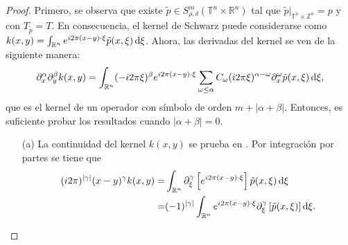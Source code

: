 \begin{proof}
	Primero, se observa que existe $\tilde{p} \in S^m_{\rho, \delta}(\mathbb{T}^n \times \mathbb{R}^n)$ tal que $\tilde{p}|_{\mathbb{T}^n \times \mathbb{Z}^n} = p$ y con $T_{\tilde{p}} = T$. En consecuencia, el kernel de Schwarz puede considerarse como $k(x, y) = \int_{\mathbb{R}^n} e^{i2\pi(x-y)\cdot \xi} \tilde{p}(x, \xi)\mathop{}\!\mathrm{d}\xi $. Ahora, las derivadas del kernel se ven de la siguiente manera:
	\begin{equation}
		\partial^\alpha_x \partial^\beta_y k(x, y) = \int_{\mathbb{R}^n} (-i2\pi\xi)^\beta e^{i2\pi(x-y)\cdot \xi} \sum_{\omega \leq \alpha} C_\omega (i2\pi\xi)^{\alpha - \omega} \partial^\omega_x \tilde{p}(x, \xi) \mathop{}\!\mathrm{d}\xi,
		\label{eq:derivada-nucleo}
	\end{equation}
	que es el kernel de un operador con símbolo de orden $m + |\alpha + \beta|$. Entonces, es suficiente probar los resultados cuando $|\alpha + \beta| = 0$.
	\begin{itemize}
		\item[(a)] La continuidad del kernel $k(x, y)$ se prueba en \cite[Teorema~4.3.6]{ruzhansky-turunen}. Por integración por partes se tiene que
		\begin{align*}
			(i2\pi)^{|\gamma|}(x - y)^\gamma k(x, y) =& \int_{\mathbb{R}^n} \partial^\gamma_\xi \left[e^{i2\pi(x-y)\cdot \xi} \right]  \tilde{p}(x, \xi) \mathop{}\!\mathrm{d}\xi \\
			= & (-1)^{|\gamma|} \int_{\mathbb{R}^n} e^{i2\pi(x-y)\cdot \xi} \partial^\gamma_\xi \left[\tilde{p}(x, \xi) \right] \mathop{}\!\mathrm{d}\xi .
		\end{align*}
		

\end{itemize}
\end{proof}
